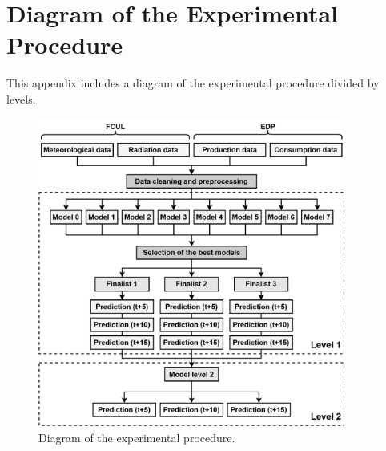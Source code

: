\chapter{Diagram of the Experimental Procedure}


\label{chapter:appendixC}

This appendix includes a diagram of the experimental procedure divided by levels.

\begin{figure}[h!]
    \centering
    \begin{center}
    \includegraphics[width=0.9\textwidth]{Images/Work2.png}
    \caption{Diagram of the experimental procedure.}
    \label{levels}
    \end{center}
\end{figure}